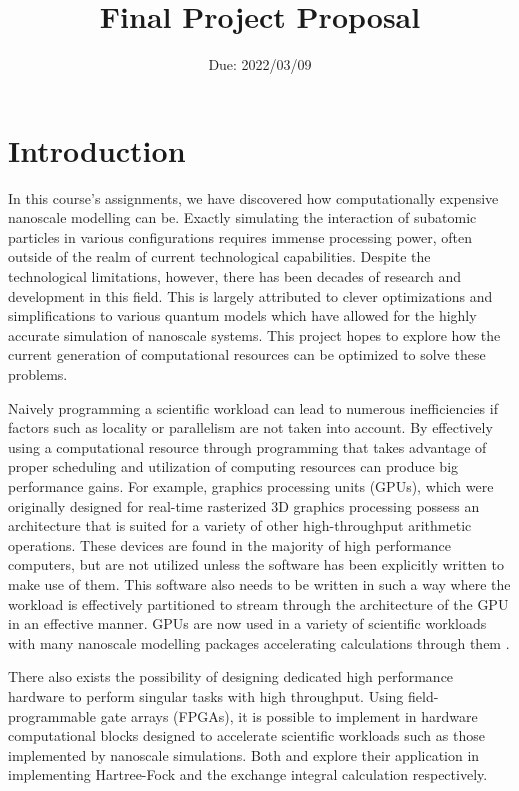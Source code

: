 \documentclass[10pt, oneside, letterpaper]{article}
\title{Final Project Proposal}
\author{}
\date{Due: 2022/03/09}
\begin{document}
\maketitle
\thispagestyle{fancy}

\section{Introduction}

In this course's assignments, we have discovered how computationally expensive nanoscale modelling can be. Exactly simulating the interaction of subatomic particles in various configurations requires immense processing power, often outside of the realm of current technological capabilities. Despite the technological limitations, however, there has been decades of research and development in this field. This is largely attributed to clever optimizations and simplifications to various quantum models which have allowed for the highly accurate simulation of nanoscale systems. This project hopes to explore how the current generation of computational resources can be optimized to solve these problems.

Naively programming a scientific workload can lead to numerous inefficiencies if factors such as locality or parallelism are not taken into account. By effectively using a computational resource through programming that takes advantage of proper scheduling and utilization of computing resources can produce big performance gains. For example, graphics processing units (GPUs), which were originally designed for real-time rasterized 3D graphics processing possess an architecture that is suited for a variety of other high-throughput arithmetic operations. These devices are found in the majority of high performance computers, but are not utilized unless the software has been explicitly written to make use of them. This software also needs to be written in such a way where the workload is effectively partitioned to stream through the architecture of the GPU in an effective manner. GPUs are now used in a variety of scientific workloads with many nanoscale modelling packages accelerating calculations through them \cite{electronic-structure-calculations-on-gpus}.

There also exists the possibility of designing dedicated high performance hardware to perform singular tasks with high throughput. Using field-programmable gate arrays (FPGAs), it is possible to implement in hardware computational blocks designed to accelerate scientific workloads such as those implemented by nanoscale simulations. Both \cite{fpga-hf} and \cite{hardware-implementation-of-the-exponent-based-computational-core-for-an-exchange-correlation-potential-matrix-generation} explore their application in implementing Hartree-Fock and the exchange integral calculation respectively.
\end{document}
